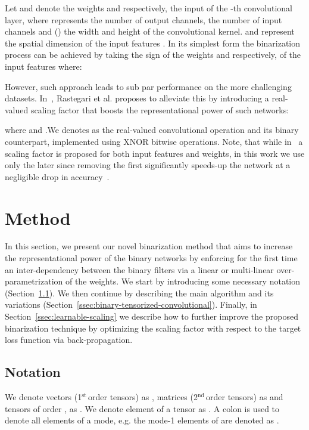 \documentclass[10pt,twocolumn,letterpaper]{article}
\newcommand{\myst}{\ensuremath{^{\text{st}}}\,}
\newcommand{\mynd}{\ensuremath{^{\text{nd}}}\,}
\begin{document}
Let  and  denote the weights and respectively, the input of the -th convolutional layer, where  represents the number of output channels,  the number of input channels and () the width and height of the convolutional kernel.  and  represent the spatial dimension of the input features . In its simplest form the binarization process can be achieved by taking the sign of the weights and respectively, of the input features where:



However, such approach leads to sub par performance on the more challenging datasets. In~\cite{rastegari2016xnor}, Rastegari et al. proposes to alleviate this by introducing a real-valued scaling factor that boosts the representational power of such networks:


where  
and .We denotes as  the real-valued convolutional operation and  its binary counterpart, implemented using XNOR bitwise operations. Note, that while in~\cite{rastegari2016xnor} a scaling factor is proposed for both input features and weights, in this work we use only the later since removing the first significantly speeds-up the network at a negligible drop in accuracy~\cite{rastegari2016xnor,bulat2017binarized}.





\section{Method}\label{sec:method}

In this section, we present our novel binarization method that aims to increase the representational power of the binary networks by enforcing for the first time an inter-dependency between the binary filters via a linear or multi-linear over-parametrization of the weights. We start by introducing some necessary notation (Section~\ref{ssec:notation}). We then continue by describing the main algorithm and its variations (Section~\ref{ssec:binary-tensorized-convolutional}). Finally, in Section~\ref{ssec:learnable-scaling} we describe how to further improve the proposed binarization technique by optimizing the scaling factor with respect to the target loss function via back-propagation. 

\subsection{Notation}\label{ssec:notation}
We denote vectors (1\myst order tensors) as , matrices (2\mynd order tensors) as  and tensors of order , as . We denote element  of a tensor as . A colon is used to denote all elements of a mode, e.g. the mode-1 elements of  are denoted as .
\end{document}
